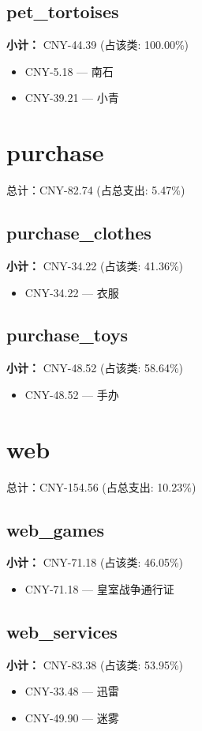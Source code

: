 \documentclass[12pt]{article}
\begin{document}
\subsection*{pet\_tortoises}
\textbf{小计：} CNY-44.39 (占该类: 100.00\%)
\begin{itemize}
    \item CNY-5.18 --- 南石
    \item CNY-39.21 --- 小青
\end{itemize}
\section*{purchase}
总计：CNY-82.74 	 (占总支出: 5.47\%)

\subsection*{purchase\_clothes}
\textbf{小计：} CNY-34.22 (占该类: 41.36\%)
\begin{itemize}
    \item CNY-34.22 --- 衣服
\end{itemize}
\subsection*{purchase\_toys}
\textbf{小计：} CNY-48.52 (占该类: 58.64\%)
\begin{itemize}
    \item CNY-48.52 --- 手办
\end{itemize}
\section*{web}
总计：CNY-154.56 	 (占总支出: 10.23\%)

\subsection*{web\_games}
\textbf{小计：} CNY-71.18 (占该类: 46.05\%)
\begin{itemize}
    \item CNY-71.18 --- 皇室战争通行证
\end{itemize}
\subsection*{web\_services}
\textbf{小计：} CNY-83.38 (占该类: 53.95\%)
\begin{itemize}
    \item CNY-33.48 --- 迅雷
    \item CNY-49.90 --- 迷雾
\end{itemize}
\end{document}
